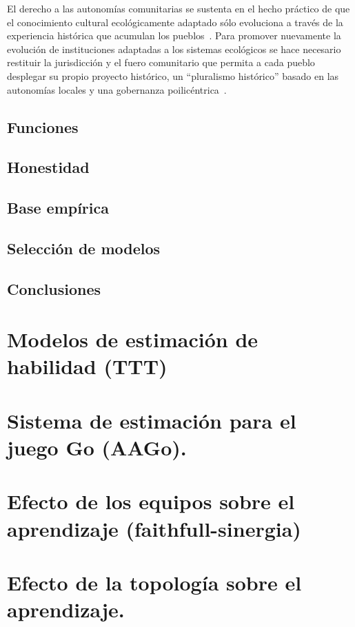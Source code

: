\documentclass[a4paper,10pt]{book}
\begin{document}







El derecho a las autonomías comunitarias se sustenta en el hecho práctico de que el conocimiento cultural ecológicamente adaptado sólo evoluciona a través de la experiencia histórica que acumulan los pueblos~\cite{Rita}.
Para promover nuevamente la evolución de instituciones adaptadas a los sistemas ecológicos se hace necesario restituir la jurisdicción y el fuero comunitario que permita a cada pueblo desplegar su propio proyecto histórico, un ``pluralismo histórico'' basado en las autonomías locales y una gobernanza poilicéntrica~\cite{Rita, ostrom}.









\section{Funciones}

\section{Honestidad}

\section{Base empírica}

\section{Selección de modelos}

\section{Conclusiones}


\chapter{Modelos de estimación de habilidad (TTT)}

\chapter{Sistema de estimación para el juego Go (AAGo).}

\chapter{Efecto de los equipos sobre el aprendizaje (faithfull-sinergia)}

\chapter{Efecto de la topología sobre el aprendizaje.}
\end{document}

